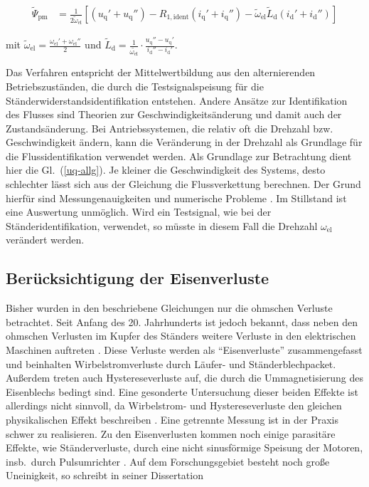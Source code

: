 \documentclass[conference,twocolumn]{IEEEtran}
\newcommand{\x}[1]{\mathrm{#1}}
\begin{document}
\begin{small}
\begin{align}
\tilde{\Psi}_\x{pm} &= \frac{1}{2\tilde{\omega}_\x{el}} [(u_\x{q}' + u_\x{q}'') - R_\x{1,ident}(i_\x{q}' + i_\x{q}'')-\tilde{\omega}_\x{el}\tilde{L}_\x{d}(i_\x{d}' + i_\x{d}'')]
\end{align}
\end{small}

mit $\tilde{\omega}_\x{el}=\frac{\omega_\x{el}'+\omega_\x{el}''}{2}$ und $\tilde{L}_\x{d} = \frac{1}{\tilde{\omega_\x{el}}}\cdot \frac{u_\x{q}'' - u_\x{q}'}{i_\x{d}''-i_\x{d}'}$.

Das Verfahren entspricht der Mittelwertbildung aus den alternierenden Betriebszuständen, die durch die Testsignalspeisung für die Ständerwiderstandsidentifikation entstehen.
Andere Ansätze zur Identifikation des Flusses sind Theorien zur Geschwindigkeitsänderung und damit auch der Zustandsänderung.
Bei Antriebssystemen, die relativ oft die Drehzahl bzw. Geschwindigkeit ändern, kann die Veränderung in der Drehzahl als Grundlage für die Flussidentifikation verwendet werden.
Als Grundlage zur Betrachtung dient hier die Gl.~(\ref{uq-allg}).
Je kleiner die Geschwindigkeit des Systems, desto schlechter lässt sich aus der Gleichung die Flussverkettung berechnen.
Der Grund hierfür sind Messungenauigkeiten und numerische Probleme \autocite{knorrenschild2}.
Im Stillstand ist eine Auswertung unmöglich.
Wird ein Testsignal, wie bei der Ständeridentifikation, verwendet, so müsste in diesem Fall die Drehzahl $\omega_\x{el}$ verändert werden.

\subsection{Berücksichtigung der Eisenverluste}\label{sec:eisenverluste}
Bisher wurden in den beschriebene Gleichungen nur die ohmschen Verluste betrachtet.
Seit Anfang des 20. Jahrhunderts ist jedoch bekannt, dass neben den ohmschen Verlusten im Kupfer des Ständers weitere Verluste in den elektrischen Maschinen auftreten \autocites{reinert_calculation_2001}{stumberger_evaluation_2003}{kilthau_parameter-measurement_2001}{stumberger_evaluation_2003}.
Diese Verluste werden als \enquote{Eisenverluste} zusammengefasst und beinhalten Wirbelstromverluste durch Läufer- und Ständerblechpacket.
Außerdem treten auch Hystereseverluste auf, die durch die Ummagnetisierung des Eisenblechs bedingt sind.
Eine gesonderte Untersuchung dieser beiden Effekte ist allerdings nicht sinnvoll, da Wirbelstrom- und Hystereseverluste den gleichen physikalischen Effekt beschreiben \autocite{reinert_calculation_2001}.
Eine getrennte Messung ist in der Praxis schwer zu realisieren.
Zu den Eisenverlusten kommen noch einige parasitäre Effekte, wie Ständerverluste, durch eine nicht sinusförmige Speisung der Motoren, insb.\ durch Pulsumrichter \autocite{Kellner2012}.
Auf dem Forschungsgebiet besteht noch große Uneinigkeit, so schreibt \textcite{Kellner2012} in seiner Dissertation
\end{document}
